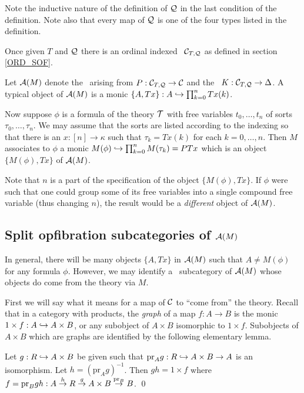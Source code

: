 Note the inductive nature of the definition of ${\bf \cal Q}$ in the last 
condition of the definition. Note also that every map of ${\bf \cal Q}$ is 
one of the four types listed in the definition. 

Once given $T$ and ${\bf \cal Q}$ there is an ordinal indexed \SOF\ ${{\bf \cal C}}_{T,{\bf \cal Q}}$ as defined in section \ref{ORD_SOF}. 

Let ${\bf \cal A} (M)$ denote the \SOF\ arising from $P : {{\bf \cal C}}_{T, {\bf \cal Q}} 
\to {\bf \cal C}$ and the \SOF\ $K : {{\bf \cal C}}_{T, {\bf \cal Q}} \to \Delta$. A 
typical object of ${\bf \cal A} (M)$ is a monic $\{A,Tx\} : A \hookrightarrow 
\prod_{k=0}^n Tx(k)$.\medskip

Now suppose $\phi$ is a formula of the theory $\cal T$ with free 
variables $t_0,\ldots,t_n$ of sorts $\tau_0,\ldots,\tau_n$. We may 
assume that the sorts are listed according to the indexing so that 
there is an $x : [n] \to \kappa$ such that $\tau_k=Tx(k)$ for each 
$k=0,\ldots,n$. Then $M$ associates to $\phi$ a monic $M(\phi) \hookrightarrow 
\prod_{k=0}^n M(\tau_k) = PTx$ which is an object $\{M(\phi),Tx\}$ of 
${\bf \cal A} (M)$.

Note that $n$ is a part of the specification of the object 
$\{M(\phi),Tx\}$. If $\phi$ were such that one could group some of 
its free variables into a single compound free variable (thus 
changing $n$), the result would be a {\em different} object of ${{\bf \cal A}}(M)$.

\subsection{Split opfibration subcategories of ${\bf \cal A} (M)$} 
\label{SOF_ATM}

In general, there will be many objects $\{A,Tx\}$ in ${\bf \cal A} (M)$ such 
that $A \neq M(\phi)$ for any formula $\phi$. However, we may 
identify a \SOF\ subcategory of ${\bf \cal A} (M)$ whose objects do come 
from the theory via $M$.

First we will say what it means for a map of ${\bf \cal C}$ to ``come from'' 
the theory. Recall that in a category with products, the {\em graph} 
of a map $f : A \to B$ is the monic $1 \times f : A \hookrightarrow A \times B$, 
or any subobject of $A \times B$ isomorphic to $1 \times f$. 
Subobjects of $A \times B$ which are graphs are identified by the 
following elementary lemma.

\begin{lem} Let $g : R \hookrightarrow A \times B$ be given such that 
$\mbox{pr}_A g : R \hookrightarrow A \times B \to A$ is an isomorphism. Let 
$h={(\mbox{pr}_A g)}^{-1}$. Then $gh = 1 \times f$ where $f = 
\mbox{pr}_B g h : A \stackrel{h}{\to} R \stackrel{g}{\to} A \times B 
\stackrel{{\rm pr}_B}{\to} B$.
\qed
\end{lem}

